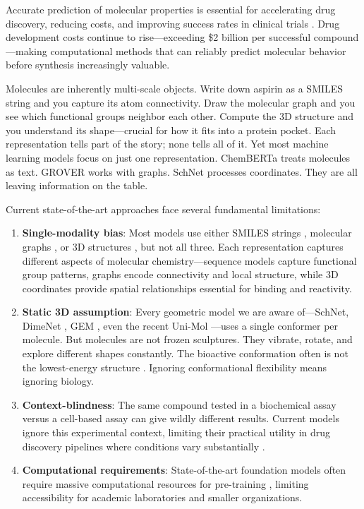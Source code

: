 \documentclass[11pt]{article}
\begin{document}
Accurate prediction of molecular properties is essential for accelerating drug discovery, reducing costs, and improving success rates in clinical trials \citep{vamathevan2019applications}. Drug development costs continue to rise---exceeding \$2 billion per successful compound \citep{dimasi2016innovation}---making computational methods that can reliably predict molecular behavior before synthesis increasingly valuable.

Molecules are inherently multi-scale objects. Write down aspirin as a SMILES string and you capture its atom connectivity. Draw the molecular graph and you see which functional groups neighbor each other. Compute the 3D structure and you understand its shape---crucial for how it fits into a protein pocket. Each representation tells part of the story; none tells all of it. Yet most machine learning models focus on just one representation. ChemBERTa \citep{chithrananda2020chemberta} treats molecules as text. GROVER \citep{rong2020grover} works with graphs. SchNet \citep{schutt2017schnet} processes coordinates. They are all leaving information on the table.

Current state-of-the-art approaches face several fundamental limitations:

\begin{enumerate}[leftmargin=*,itemsep=2pt]
    \item \textbf{Single-modality bias}: Most models use either SMILES strings \citep{chithrananda2020chemberta}, molecular graphs \citep{rong2020grover}, or 3D structures \citep{schutt2017schnet}, but not all three. Each representation captures different aspects of molecular chemistry---sequence models capture functional group patterns, graphs encode connectivity and local structure, while 3D coordinates provide spatial relationships essential for binding and reactivity.

    \item \textbf{Static 3D assumption}: Every geometric model we are aware of---SchNet, DimeNet \citep{gasteiger2020directional}, GEM \citep{fang2022geometry}, even the recent Uni-Mol \citep{zhou2023unimol}---uses a single conformer per molecule. But molecules are not frozen sculptures. They vibrate, rotate, and explore different shapes constantly. The bioactive conformation often is not the lowest-energy structure \citep{hawkins2017conformation}. Ignoring conformational flexibility means ignoring biology.

    \item \textbf{Context-blindness}: The same compound tested in a biochemical assay versus a cell-based assay can give wildly different results. Current models ignore this experimental context, limiting their practical utility in drug discovery pipelines where conditions vary substantially \citep{kola2004can}.

    \item \textbf{Computational requirements}: State-of-the-art foundation models often require massive computational resources for pre-training \citep{zhou2023unimol}, limiting accessibility for academic laboratories and smaller organizations.
\end{enumerate}
\end{document}

